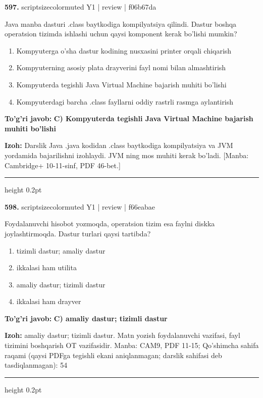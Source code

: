 \documentclass[10pt,a4paper]{article}
\begin{document}
{\bfseries\sffamily\color{ink} 597.} {scriptsizecolor{muted} Y1 | review | f06b67da}
\par
Java manba dasturi .class baytkodiga kompilyatsiya qilindi. Dastur boshqa operatsion tizimda ishlashi uchun qaysi komponent kerak bo'lishi mumkin?
\begin{enumerate}[label=\Alph*),leftmargin=9mm]
\item Kompyuterga o'sha dastur kodining nusxasini printer orqali chiqarish
\item Kompyuterning asosiy plata drayverini fayl nomi bilan almashtirish
\item Kompyuterda tegishli Java Virtual Machine bajarish muhiti bo'lishi
\item Kompyuterdagi barcha .class fayllarni oddiy rastrli rasmga aylantirish
\end{enumerate}
\begin{tcolorbox}[enhanced,breakable,colback=teal!4,colframe=teal!60!black,boxrule=0.45pt,arc=1.2mm,left=2.7mm,right=2.7mm,top=1.8mm,bottom=1.8mm,before skip=2mm,after skip=2mm]
{\bfseries\sffamily\color{teal}To'g'ri javob:} \textbf{C) Kompyuterda tegishli Java Virtual Machine bajarish muhiti bo'lishi}
\par\smallskip
{\bfseries Izoh:} Darslik Java .java kodidan .class baytkodiga kompilyatsiya va JVM yordamida bajarilishni izohlaydi. JVM ning mos muhiti kerak bo'ladi. [Manba: Cambridge+ 10-11-sinf, PDF 46-bet.]
\end{tcolorbox}
\vspace{2mm}\hrule height 0.2pt\vspace{3mm}

{\bfseries\sffamily\color{ink} 598.} {scriptsizecolor{muted} Y1 | review | f66eabae}
\par
Foydalanuvchi hisobot yozmoqda, operatsion tizim esa faylni diskka joylashtirmoqda. Dastur turlari qaysi tartibda?
\begin{enumerate}[label=\Alph*),leftmargin=9mm]
\item tizimli dastur; amaliy dastur
\item ikkalasi ham utilita
\item amaliy dastur; tizimli dastur
\item ikkalasi ham drayver
\end{enumerate}
\begin{tcolorbox}[enhanced,breakable,colback=teal!4,colframe=teal!60!black,boxrule=0.45pt,arc=1.2mm,left=2.7mm,right=2.7mm,top=1.8mm,bottom=1.8mm,before skip=2mm,after skip=2mm]
{\bfseries\sffamily\color{teal}To'g'ri javob:} \textbf{C) amaliy dastur; tizimli dastur}
\par\smallskip
{\bfseries Izoh:} amaliy dastur; tizimli dastur. Matn yozish foydalanuvchi vazifasi, fayl tizimini boshqarish OT vazifasidir. Manba: CAM9, PDF 11-15; Qo'shimcha sahifa raqami (qaysi PDFga tegishli ekani aniqlanmagan; darslik sahifasi deb tasdiqlanmagan): 54
\end{tcolorbox}
\vspace{2mm}\hrule height 0.2pt\vspace{3mm}
\end{document}
